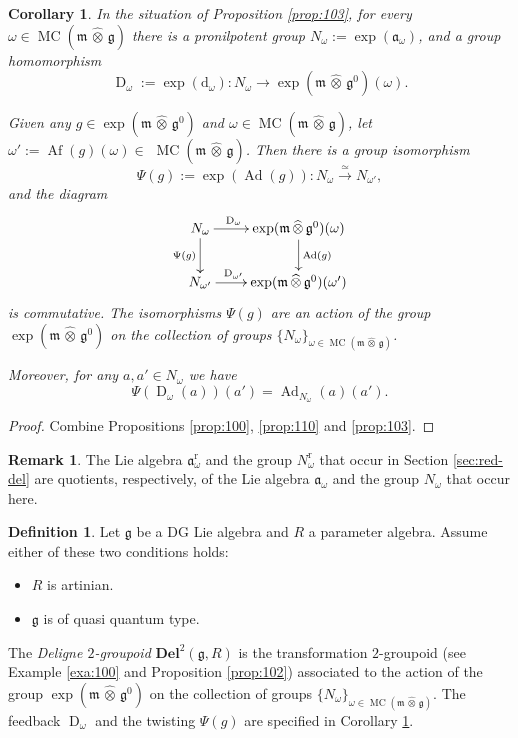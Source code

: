 \documentclass[a4paper,10pt]{amsart}
\newtheorem{cor}[equation]{Corollary}
\theoremstyle{definition}
\newtheorem{dfn}[equation]{Definition}
\newtheorem{rem}[equation]{Remark}
\numberwithin{equation}{section}
\newcommand{\iso}{\xrightarrow{\simeq}}
\newcommand{\opn}{\operatorname}
\newcommand{\rmitem}[1]{\item[\text{\textup{(#1)}}]}
\newcommand{\mfrak}[1]{\mathfrak{#1}}
\newcommand{\mbf}[1]{\mathbf{#1}}
\newcommand{\mrm}[1]{\mathrm{#1}}
\newcommand{\tup}[1]{\textup{#1}}
\newcommand{\what}[1]{\widehat{#1}}
\newcommand{\hatotimes}{\, \what{\otimes} \,}
\newcommand{\hot}{\hatotimes}
\newcommand{\g}{\mfrak{g}}
\newcommand{\m}{\mfrak{m}}
\renewcommand{\a}{\mfrak{a}}
\renewcommand{\d}{\mrm{d}}
\newcommand{\om}{\omega}
\newcommand{\lb}{\linebreak}
\begin{document}
\begin{cor} \label{cor:101}
In the situation of Proposition \tup{\ref{prop:103}}, for every 
$\om \in \opn{MC}(\m \hot \g)$
there is a pronilpotent group 
$N_{\om} := \opn{exp}(\a_{\om})$, and a group homomorphism 
\[ \opn{D}_{\om} :=  \opn{exp}(\d_{\om}) : N_{\om} \to 
\opn{exp}(\m \hot \g^0)(\om)  . \]

Given any $g \in \opn{exp}(\m \hot \g^0)$
and $\om \in \opn{MC}(\m \hot \g)$, let 
$\om' := \opn{Af}(g)(\om) \in$ \lb $\opn{MC}(\m \hot \g)$. Then there is a
group isomorphism
\[ \Psi(g) := \opn{exp}(\opn{Ad}(g)) : N_{\om} \iso N_{\om'} , \]
and the diagram 
\[ \UseTips \xymatrix @C=5ex @R=5ex {
N_{\om}
\ar[d]_{\Psi(g)}
\ar[r]^(0.34){\opn{D}_{\om}}
&
\opn{exp}(\m \hot \g^0)(\om)
\ar[d]^{\opn{Ad}(g)}
\\
N_{\om'}
\ar[r]^(0.34){\opn{D}_{\om'}}
&
\opn{exp}(\m \hot \g^0)(\om')
} \]
is commutative.
The isomorphisms $\Psi(g)$ are an action of the group 
$\opn{exp}(\m \hot \g^0)$ on the collection of groups 
$\{ N_{\om} \}_{\om \in \opn{MC}(\m \hot \g)}$.

Moreover, for any $a, a' \in N_{\om}$ we have 
\[ \Psi( \opn{D}_{\om}(a))(a') = 
\opn{Ad}_{N_{\om}}(a)(a') . \]
\end{cor}

\begin{proof}
Combine Propositions \ref{prop:100}, \ref{prop:110} and \ref{prop:103}.
\end{proof}

\begin{rem}
The Lie algebra $\a_{\om}^{\mrm{r}}$ and the group $N_{\om}^{\mrm{r}}$ that
occur in Section 
\ref{sec:red-del} are quotients, respectively, of the Lie algebra $\a_{\om}$ and
the group $N_{\om}$ that occur here. 
\end{rem}

\begin{dfn} \label{dfn:103}
Let $\g$ be a DG Lie algebra and $R$ a parameter algebra. 
Assume either of these two conditions holds:
\begin{itemize}
\rmitem{i} $R$ is artinian.  
\rmitem{ii} $\g$ is of quasi quantum type.
\end{itemize} 
The {\em Deligne $2$-groupoid} $\mbf{Del}^2(\g, R)$
is the transformation $2$-groupoid (see Example \ref{exa:100} and Proposition 
\ref{prop:102}) associated to the action of the group 
$\opn{exp}(\m \hot \g^0)$
on the collection of groups 
$\{ N_{\om} \}_{\om \in \opn{MC}(\m \hot \g)}$.
The feedback $\opn{D}_{\om}$ and the twisting $\Psi(g)$ are specified in
Corollary \ref{cor:101}.
\end{dfn}
\end{document}

